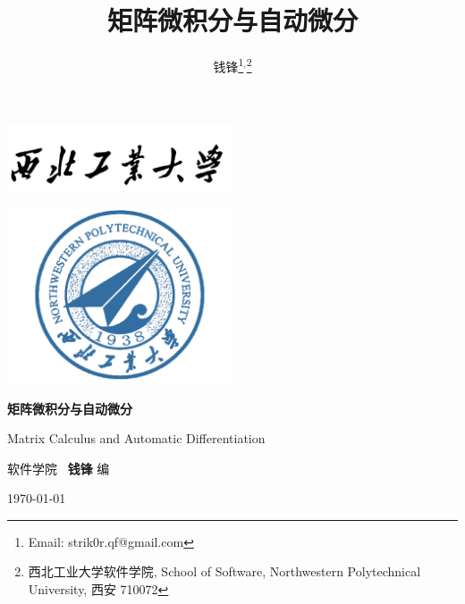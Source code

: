 \documentclass[10pt,UTF8]{book} %
\title{\textbf{矩阵微积分与自动微分}}
\author{钱锋\thanks{Email: strik0r.qf@gmail.com}${}^,$\thanks{
    西北工业大学软件学院, School of Software, Northwestern Polytechnical University, 西安 710072
}}
\begin{document}


\pagestyle{empty}
\begin{titlepage}
    \thispagestyle{empty}
    \centering
        \vspace*{3cm}
        \includegraphics[width=0.5\textwidth]{pic/npu_2.png}\par
        \vspace{1em}
        \includegraphics[width=0.5\textwidth]{pic/npu_1.png}\par
    \vspace*{1em}
        \begin{center}
            \Huge \heiti \textbf{矩阵微积分与自动微分}

            Matrix Calculus and Automatic Differentiation
        \end{center}

        \vspace{11em}
        \begin{center}
        \songti

        \kaishu 软件学院 \, \heiti\textbf{钱锋} \quad \songti 编
        \vspace{0.5em}

    \today
    \end{center}
\end{titlepage}
\cleardoublepage
\maketitle
\cleardoublepage
\frontmatter
\newpage
\pagestyle{plain}
\makeatother

\pagestyle{plain}
{\tableofcontents}
\newpage
\thispagestyle{empty}
\cleardoublepage %
\end{document}
